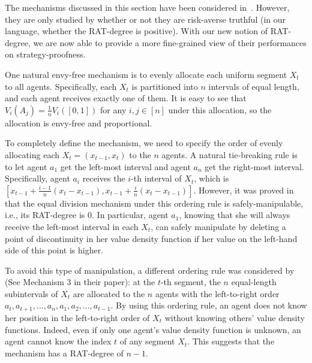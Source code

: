 
The mechanisms discussed in this section have been considered in~\citet{BU2023Rat}.
However, they are only studied by whether or not they are risk-averse truthful (in our language, whether the RAT-degree is positive).
With our new notion of RAT-degree, we are now able to provide a more fine-grained view of their performances on strategy-proofness.

One natural envy-free mechanism is to evenly allocate each uniform segment $X_t$ to all agents.
Specifically, each $X_t$ is partitioned into $n$ intervals of equal length, and each agent receives exactly one of them.
It is easy to see that $V_i(A_j)=\frac1nV_i([0,1])$ for any $i,j\in[n]$ under this allocation, so the allocation is envy-free and proportional.

To completely define the mechanism, we need to specify the order of evenly allocating each $X_t=(x_{t-1},x_t)$ to the $n$ agents.
A natural tie-breaking rule is to let agent $a_1$ get the left-most interval and agent $a_n$ get the right-most interval.
Specifically, agent $a_i$ receives the $i$-th interval of $X_t$, which is $[x_{t-1}+\frac{i-1}n(x_t-x_{t-1}),x_{t-1}+\frac{i}n(x_t-x_{t-1})]$.
However, it was proved in~\citet{BU2023Rat} that the equal division mechanism under this ordering rule is safely-manipulable, i.e., its RAT-degree is $0$.
In particular, agent $a_1$, knowing that she will always receive the left-most interval in each $X_t$, can safely manipulate by deleting a point of discontinuity in her value density function if her value on the left-hand side of this point is higher.

To avoid this type of manipulation, a different ordering rule was considered by~\citet{BU2023Rat} (See Mechanism 3 in their paper): at the $t$-th segment, the $n$ equal-length subintervals of $X_t$ are allocated to the $n$ agents with the left-to-right order $a_t,a_{t+1},\ldots,a_n,a_1,a_2,\ldots,a_{t-1}$.
By using this ordering rule, an agent does not know her position in the left-to-right order of $X_t$ without knowing others' value density functions.
Indeed, even if only one agent's value density function is unknown, an agent cannot know the index $t$ of any segment $X_t$.
This suggests that the mechanism has a RAT-degree of $n-1$.

